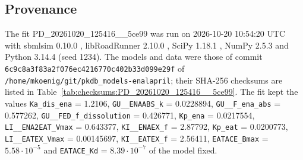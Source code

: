 \subsection{Provenance}

The fit PD\_20261020\_125416\_\_5ce99 was run on 2026-10-20 10:54:20 UTC with sbmlsim 0.10.0 \cite{Koenig2026_sbmlsim}, libRoadRunner 2.10.0 \cite{Welsh2023}, SciPy 1.18.1 \cite{Virtanen2020}, NumPy 2.5.3 \cite{Harris2020} and Python 3.14.4 (seed 1234). The models and data were those of commit \texttt{6c9c8a3f83a2f076ec4216770c402b33d099e29f} of \texttt{/home/mkoenig/git/pkdb\_models-enalapril}; their SHA-256 checksums are listed in Table~\ref{tab:checksums:PD_20261020_125416__5ce99}. The fit kept the values \texttt{Ka\_dis\_ena} = 1.2106, \texttt{GU\_\_ENAABS\_k} = 0.0228894, \texttt{GU\_\_F\_ena\_abs} = 0.577262, \texttt{GU\_\_FED\_f\_dissolution} = 0.426771, \texttt{Kp\_ena} = 0.0217554, \texttt{LI\_\_ENA2EAT\_Vmax} = 0.643377, \texttt{KI\_\_ENAEX\_f} = 2.87792, \texttt{Kp\_eat} = 0.0200773, \texttt{LI\_\_EATEX\_Vmax} = 0.00145697, \texttt{KI\_\_EATEX\_f} = 2.56411, \texttt{EATACE\_Bmax} = $5.58 \cdot 10^{-5}$ and \texttt{EATACE\_Kd} = $8.39 \cdot 10^{-7}$ of the model fixed.

